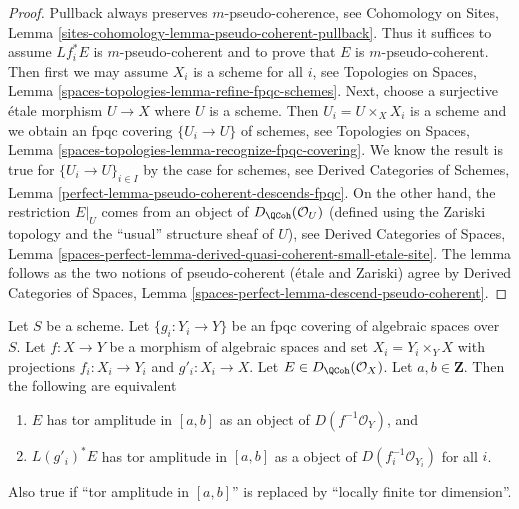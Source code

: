 \begin{proof}
Pullback always preserves $m$-pseudo-coherence, see
Cohomology on Sites, Lemma
\ref{sites-cohomology-lemma-pseudo-coherent-pullback}.
Thus it suffices to assume $Lf_i^*E$ is $m$-pseudo-coherent
and to prove that $E$ is $m$-pseudo-coherent.
Then first we may assume $X_i$ is a scheme for all $i$, see
Topologies on Spaces, Lemma \ref{spaces-topologies-lemma-refine-fpqc-schemes}.
Next, choose a  surjective \'etale morphism $U \to X$ where $U$ is a scheme.
Then $U_i = U \times_X X_i$ is a scheme and we obtain an fpqc covering
$\{U_i \to U\}$ of schemes, see
Topologies on Spaces, Lemma
\ref{spaces-topologies-lemma-recognize-fpqc-covering}.
We know the result is true for
$\{U_i \to U\}_{i \in I}$ by the case for schemes, see
Derived Categories of Schemes, Lemma
\ref{perfect-lemma-pseudo-coherent-descends-fpqc}.
On the other hand, the restriction $E|_U$ comes from
an object of $D_\QCoh(\mathcal{O}_U)$ (defined using the Zariski
topology and the ``usual'' structure sheaf of $U$), see
Derived Categories of Spaces, Lemma
\ref{spaces-perfect-lemma-derived-quasi-coherent-small-etale-site}.
The lemma follows as the two notions of pseudo-coherent
(\'etale and Zariski) agree by
Derived Categories of Spaces,
Lemma \ref{spaces-perfect-lemma-descend-pseudo-coherent}.
\end{proof}

\begin{lemma}
\label{lemma-tor-amplitude-descends-fppf}
Let $S$ be a scheme. Let $\{g_i : Y_i \to Y\}$ be an fpqc covering of
algebraic spaces over $S$. Let $f : X \to Y$ be a morphism of algebraic
spaces and set $X_i = Y_i \times_Y X$ with projections $f_i : X_i \to Y_i$
and $g'_i : X_i \to X$. Let $E \in D_\QCoh(\mathcal{O}_X)$.
Let $a, b \in \mathbf{Z}$. Then the following are equivalent
\begin{enumerate}
\item $E$ has tor amplitude in $[a, b]$ as an object of
$D(f^{-1}\mathcal{O}_Y)$, and
\item $L(g'_i)^*E$ has tor amplitude in $[a, b]$ as a object of
$D(f_i^{-1}\mathcal{O}_{Y_i})$ for all $i$.
\end{enumerate}
Also true if ``tor amplitude in $[a, b]$'' is replaced by
``locally finite tor dimension''.
\end{lemma}

